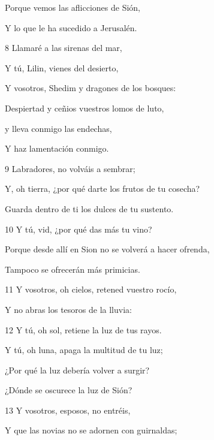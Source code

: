 \par Porque vemos las aflicciones de Sión,

\par Y lo que le ha sucedido a Jerusalén.

\par 8 Llamaré a las sirenas del mar,

\par Y tú, Lilin, vienes del desierto,

\par Y vosotros, Shedim y dragones de los bosques:

Despiertad y ceñios vuestros lomos de luto,

\par y lleva conmigo las endechas,

\par Y haz lamentación conmigo.

\par 9 Labradores, no volváis a sembrar;

\par Y, oh tierra, ¿por qué darte los frutos de tu cosecha?

\par Guarda dentro de ti los dulces de tu sustento.

\par 10 Y tú, vid, ¿por qué das más tu vino?

Porque desde allí en Sion no se volverá a hacer ofrenda,

\par Tampoco se ofrecerán más primicias.

\par 11 Y vosotros, oh cielos, retened vuestro rocío,

\par Y no abras los tesoros de la lluvia:

\par 12 Y tú, oh sol, retiene la luz de tus rayos.

Y tú, oh luna, apaga la multitud de tu luz;

\par ¿Por qué la luz debería volver a surgir?

\par ¿Dónde se oscurece la luz de Sión?

\par 13 Y vosotros, esposos, no entréis,

Y que las novias no se adornen con guirnaldas;

